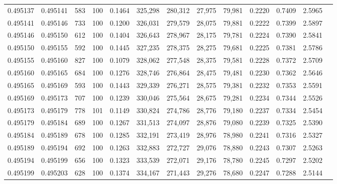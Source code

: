\begin{tabular}{rrrrrrrrrrrrr}
0.495137 & 0.495141 &   583 & 100 &                                     0.1464 & 325,298 & 280,312 &  27,975 &  79,981 & 0.2220 & 0.7409 & 2.5965 \\
0.495141 & 0.495146 &   733 & 100 &                                     0.1200 & 326,031 & 279,579 &  28,075 &  79,881 & 0.2222 & 0.7399 & 2.5897 \\
0.495146 & 0.495150 &   612 & 100 &                                     0.1404 & 326,643 & 278,967 &  28,175 &  79,781 & 0.2224 & 0.7390 & 2.5841 \\
0.495150 & 0.495155 &   592 & 100 &                                     0.1445 & 327,235 & 278,375 &  28,275 &  79,681 & 0.2225 & 0.7381 & 2.5786 \\
0.495155 & 0.495160 &   827 & 100 &                                     0.1079 & 328,062 & 277,548 &  28,375 &  79,581 & 0.2228 & 0.7372 & 2.5709 \\
0.495160 & 0.495165 &   684 & 100 &                                     0.1276 & 328,746 & 276,864 &  28,475 &  79,481 & 0.2230 & 0.7362 & 2.5646 \\
0.495165 & 0.495169 &   593 & 100 &                                     0.1443 & 329,339 & 276,271 &  28,575 &  79,381 & 0.2232 & 0.7353 & 2.5591 \\
0.495169 & 0.495173 &   707 & 100 &                                     0.1239 & 330,046 & 275,564 &  28,675 &  79,281 & 0.2234 & 0.7344 & 2.5526 \\
0.495173 & 0.495179 &   778 & 101 &                                     0.1149 & 330,824 & 274,786 &  28,776 &  79,180 & 0.2237 & 0.7334 & 2.5454 \\
0.495179 & 0.495184 &   689 & 100 &                                     0.1267 & 331,513 & 274,097 &  28,876 &  79,080 & 0.2239 & 0.7325 & 2.5390 \\
0.495184 & 0.495189 &   678 & 100 &                                     0.1285 & 332,191 & 273,419 &  28,976 &  78,980 & 0.2241 & 0.7316 & 2.5327 \\
0.495189 & 0.495194 &   692 & 100 &                                     0.1263 & 332,883 & 272,727 &  29,076 &  78,880 & 0.2243 & 0.7307 & 2.5263 \\
0.495194 & 0.495199 &   656 & 100 &                                     0.1323 & 333,539 & 272,071 &  29,176 &  78,780 & 0.2245 & 0.7297 & 2.5202 \\
0.495199 & 0.495203 &   628 & 100 &                                     0.1374 & 334,167 & 271,443 &  29,276 &  78,680 & 0.2247 & 0.7288 & 2.5144 \\

\end{tabular}
